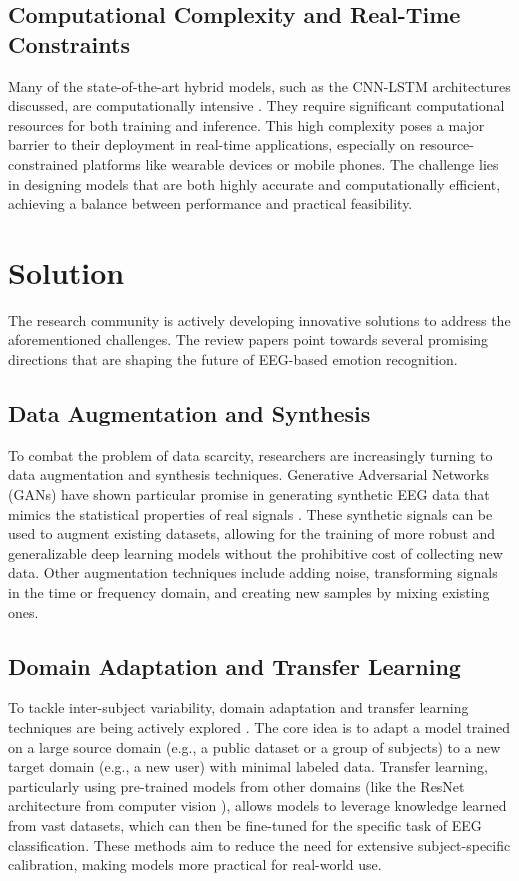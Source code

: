 \documentclass[conference]{IEEEtran}
\begin{document}
\subsection*{Computational Complexity and Real-Time Constraints}
Many of the state-of-the-art hybrid models, such as the CNN-LSTM architectures discussed, are computationally intensive \cite{b4}. They require significant computational resources for both training and inference. This high complexity poses a major barrier to their deployment in real-time applications, especially on resource-constrained platforms like wearable devices or mobile phones. The challenge lies in designing models that are both highly accurate and computationally efficient, achieving a balance between performance and practical feasibility.

\section{Solution}
The research community is actively developing innovative solutions to address the aforementioned challenges. The review papers point towards several promising directions that are shaping the future of EEG-based emotion recognition.

\subsection*{Data Augmentation and Synthesis}
To combat the problem of data scarcity, researchers are increasingly turning to data augmentation and synthesis techniques. Generative Adversarial Networks (GANs) have shown particular promise in generating synthetic EEG data that mimics the statistical properties of real signals \cite{b5}. These synthetic signals can be used to augment existing datasets, allowing for the training of more robust and generalizable deep learning models without the prohibitive cost of collecting new data. Other augmentation techniques include adding noise, transforming signals in the time or frequency domain, and creating new samples by mixing existing ones.

\subsection*{Domain Adaptation and Transfer Learning}
To tackle inter-subject variability, domain adaptation and transfer learning techniques are being actively explored \cite{b3}. The core idea is to adapt a model trained on a large source domain (e.g., a public dataset or a group of subjects) to a new target domain (e.g., a new user) with minimal labeled data. Transfer learning, particularly using pre-trained models from other domains (like the ResNet architecture from computer vision \cite{b2}), allows models to leverage knowledge learned from vast datasets, which can then be fine-tuned for the specific task of EEG classification. These methods aim to reduce the need for extensive subject-specific calibration, making models more practical for real-world use.
\end{document}
